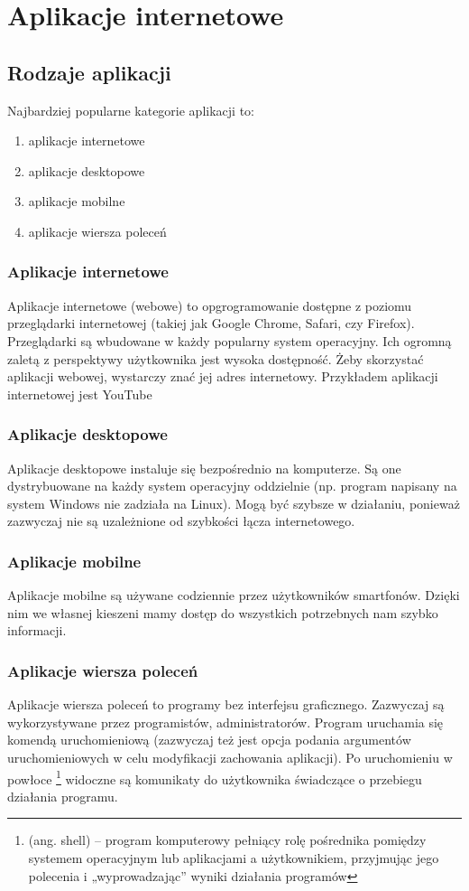 \chapter{Aplikacje internetowe}

\section{Rodzaje aplikacji}
Najbardziej popularne kategorie aplikacji \cite{typy-aplikacji} to:
\begin{enumerate}
    \item aplikacje internetowe
    \item aplikacje desktopowe
    \item aplikacje mobilne
    \item aplikacje wiersza poleceń
\end{enumerate}

\subsection{Aplikacje internetowe}
Aplikacje internetowe (webowe) to opgrogramowanie dostępne z poziomu przeglądarki internetowej (takiej jak Google Chrome, Safari, czy Firefox). Przeglądarki są wbudowane w każdy popularny system operacyjny. Ich ogromną zaletą z perspektywy użytkownika jest wysoka dostępność. Żeby skorzystać aplikacji webowej, wystarczy znać jej adres internetowy. Przykładem aplikacji internetowej jest YouTube \cite{youtube}
\subsection{Aplikacje desktopowe}
Aplikacje desktopowe instaluje się bezpośrednio na komputerze. Są one dystrybuowane na każdy system operacyjny oddzielnie (np. program napisany na system Windows nie zadziała na Linux). Mogą być szybsze w działaniu, ponieważ zazwyczaj nie są uzależnione od szybkości łącza internetowego.
\subsection{Aplikacje mobilne}
Aplikacje mobilne są używane codziennie przez użytkowników smartfonów. Dzięki nim we własnej kieszeni mamy dostęp do wszystkich potrzebnych nam szybko informacji.
\subsection{Aplikacje wiersza poleceń}
Aplikacje wiersza poleceń to programy bez interfejsu graficznego. Zazwyczaj są wykorzystywane przez programistów, administratorów. Program uruchamia się komendą uruchomieniową (zazwyczaj też jest opcja podania argumentów uruchomieniowych w celu modyfikacji zachowania aplikacji). Po uruchomieniu w powłoce \footnote{(ang. shell) – program komputerowy pełniący rolę pośrednika pomiędzy systemem operacyjnym lub aplikacjami a użytkownikiem, przyjmując jego polecenia i „wyprowadzając” wyniki działania programów} widoczne są komunikaty do użytkownika świadczące o przebiegu działania programu.  

